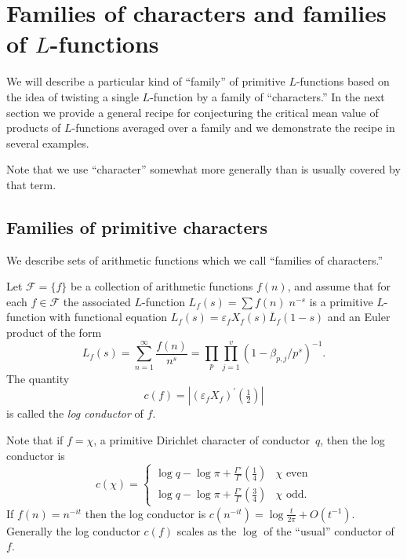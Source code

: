 \documentclass[12pt,letterpaper]{amsart}
\theoremstyle{plain}
\theoremstyle{definition}
\theoremstyle{remark}
\numberwithin{equation}{subsection}
\numberwithin{theorem}{subsection}
\numberwithin{table}{subsection}
\begin{document}

\section{  Families of characters and families of $L$-functions
}\label{sec:families}
We will describe a particular kind of ``family'' of primitive  $L$-functions
based on the idea of twisting a single $L$-function by a family of
``characters.''  
In the next section we provide a general recipe for conjecturing the 
critical mean value of products of $L$-functions averaged
over a family and we demonstrate the recipe in  
several examples.

Note that we use ``character'' somewhat more generally
than is usually covered by that term.


\subsection{  Families of primitive characters
}\label{sec:familiesofcharacters} We describe sets of arithmetic functions
which we call ``families of characters.''

Let $\mathcal{F} = \{f\}$ be a collection of arithmetic
functions $f(n)$,  and
assume that for each $f\in \mathcal{F}$ the associated $L$-function
$L_f(s)=\sum f(n)\;n^{-s}$ is a primitive $L$-function 
with  functional equation $L_f(s)=\varepsilon_f X_f(s)\overline{L}_f(1-s)$ and
an Euler product of the form
\begin{equation}\label{eqn:genep}
L_f(s)=\sum_{n=1}^\infty
\frac{f(n)}{n^s}=\prod_p\prod_{j=1}^v(1-\beta_{p,j}/p^s)^{-1} .
\end{equation}
The quantity 
\begin{equation}
c(f)=|(\varepsilon_f X_f)^\prime(\tfrac12)|
\end{equation}
is called the {\it log conductor} of $f$.

Note that if $f=\chi$, a primitive Dirichlet character of conductor~$q$,
then the log conductor is
\begin{equation}
c(\chi)=
\begin{cases}
\log q  -\log \pi +\frac{\Gamma'}{\Gamma}(\tfrac 14) & \chi \text{\ \ even} \\
\log q  -\log \pi +\frac{\Gamma'}{\Gamma}(\tfrac 34) & \chi \text{\ \ odd} .
\end{cases}
\end{equation}
If $f(n)=n^{-it}$ then the log conductor is
$c(n^{-it})=\log\frac{t}{2\pi}+O(t^{-1})$.
Generally the log conductor $c(f)$ 
scales as
the $\log$ of the ``usual'' conductor of~$f$.
 
\end{document}
